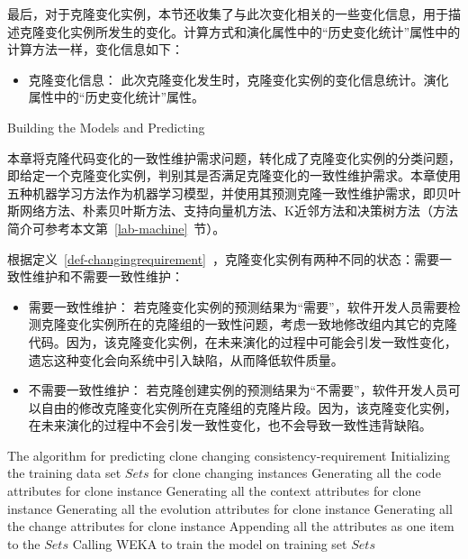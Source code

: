 最后，对于克隆变化实例，本节还收集了与此次变化相关的一些变化信息，用于描述克隆变化实例所发生的变化。计算方式和演化属性中的“历史变化统计”属性中的计算方法一样，变化信息如下：

\begin {itemize}
\item
克隆变化信息：
此次克隆变化发生时，克隆变化实例的变化信息统计。演化属性中的“历史变化统计”属性。
\end {itemize}


{Building the Models and Predicting} 

本章将克隆代码变化的一致性维护需求问题，转化成了克隆变化实例的分类问题，即给定一个克隆变化实例，判别其是否满足克隆变化的一致性维护需求。本章使用五种机器学习方法作为机器学习模型，并使用其预测克隆一致性维护需求，即贝叶斯网络方法、朴素贝叶斯方法、支持向量机方法、K近邻方法和决策树方法（方法简介可参考本文第~\ref{lab-machine}~节）。

根据定义~\ref{def-changingrequirement}~，克隆变化实例有两种不同的状态：需要一致性维护和不需要一致性维护：
\begin{itemize}
\item 
需要一致性维护：
若克隆变化实例的预测结果为“需要”，软件开发人员需要检测克隆变化实例所在的克隆组的一致性问题，考虑一致地修改组内其它的克隆代码。因为，该克隆变化实例，在未来演化的过程中可能会引发一致性变化，遗忘这种变化会向系统中引入缺陷，从而降低软件质量。
\item
不需要一致性维护：
若克隆创建实例的预测结果为“不需要”，软件开发人员可以自由的修改克隆变化实例所在克隆组的克隆片段。因为，该克隆变化实例，在未来演化的过程中不会引发一致性变化，也不会导致一致性违背缺陷。
\end{itemize}

\vspace{1em}
\begin{minipage}{0.8\textwidth}
\centering
\begin{algorithm}[H]
 {The algorithm for predicting clone changing consistency-requirement}
\label{alg-changingperdition}
Initializing the training data set $Sets$ for clone changing instances\; 
{ 
Generating all the code attributes for clone instance\;
Generating all the context attributes for clone instance\;
Generating all the evolution attributes for clone instance\;
Generating all the change attributes for clone instance\;
Appending all the attributes as one item to the $Sets$\;
}
Calling WEKA to train the model on training set $Sets$\;
\end{algorithm}
\end{minipage}
\vspace{1em}

